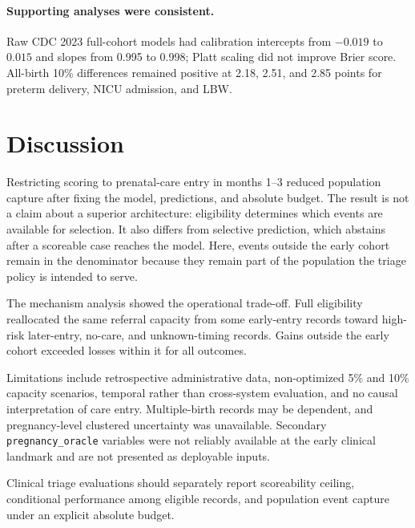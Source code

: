 \documentclass[pmlr,twocolumn,10pt]{jmlr}
\newif\iffinal
\begin{document}
\paragraph{Supporting analyses were consistent.}
Raw CDC 2023 full-cohort models had calibration intercepts from $-0.019$ to
$0.015$ and slopes from 0.995 to 0.998; Platt scaling did not improve Brier
score. All-birth 10\% differences remained positive at 2.18, 2.51, and 2.85
points for preterm delivery, NICU admission, and LBW.

\FloatBarrier

\section{Discussion}
\label{sec:discussion}

Restricting scoring to prenatal-care entry in months 1--3 reduced population
capture after fixing the model, predictions, and absolute budget. The result
is not a claim about a superior architecture: eligibility determines which
events are available for selection. It also differs from selective
prediction, which abstains after a scoreable case reaches the model. Here,
events outside the early cohort remain in the denominator because they remain
part of the population the triage policy is intended to serve.

The mechanism analysis showed the operational trade-off. Full eligibility
reallocated the same referral capacity from some early-entry records toward
high-risk later-entry, no-care, and unknown-timing records. Gains outside the
early cohort exceeded losses within it for all outcomes.

Limitations include retrospective administrative data, non-optimized 5\% and
10\% capacity scenarios, temporal rather than cross-system evaluation, and no
causal interpretation of care entry. Multiple-birth records may be dependent,
and pregnancy-level clustered uncertainty was unavailable. Secondary
\texttt{pregnancy\_oracle} variables were not reliably available at the early
clinical landmark and are not presented as deployable inputs.

Clinical triage evaluations should separately report scoreability ceiling,
conditional performance among eligible records, and population event capture
under an explicit absolute budget.

\iffinal
\acks{Acknowledgments will be added only to the camera-ready manuscript.}
\fi

\nolinenumbers
\begingroup
\small
\setlength{\bibsep}{2pt}

\endgroup
\end{document}
